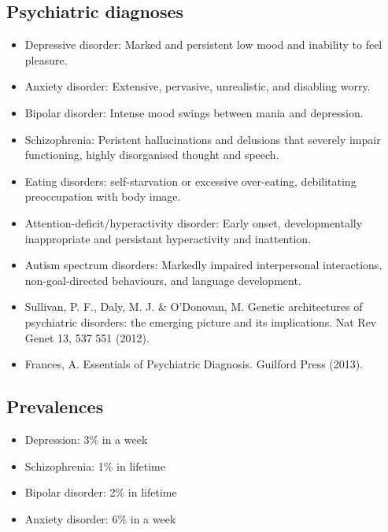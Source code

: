 \documentclass[
  letterpaper,
  DIV=11,
  numbers=noendperiod]{scrartcl}
\providecommand{\tightlist}{%
  \setlength{\itemsep}{0pt}\setlength{\parskip}{0pt}}
\begin{document}
\subsection{Psychiatric diagnoses}\label{psychiatric-diagnoses}

\begin{itemize}
\tightlist
\item
  Depressive disorder: Marked and persistent low mood and inability to
  feel pleasure.
\item
  Anxiety disorder: Extensive, pervasive, unrealistic, and disabling
  worry.
\item
  Bipolar disorder: Intense mood swings between mania and depression.
\item
  Schizophrenia: Peristent hallucinations and delusions that severely
  impair functioning, highly disorganised thought and speech.
\item
  Eating disorders: self-starvation or excessive over-eating,
  debilitating preoccupation with body image.
\item
  Attention-deficit/hyperactivity disorder: Early onset, developmentally
  inappropriate and persistant hyperactivity and inattention.
\item
  Autism spectrum disorders: Markedly impaired interpersonal
  interactions, non-goal-directed behaviours, and language development.
\end{itemize}

\begin{itemize}
\tightlist
\item
  Sullivan, P. F., Daly, M. J. \& O'Donovan, M. Genetic architectures of
  psychiatric disorders: the emerging picture and its implications. Nat
  Rev Genet 13, 537 551 (2012).
\item
  Frances, A. Essentials of Psychiatric Diagnosis. Guilford Press
  (2013).
\end{itemize}

\subsection{Prevalences}\label{prevalences}

\begin{itemize}
\tightlist
\item
  Depression: 3\% in a week
\item
  Schizophrenia: 1\% in lifetime
\item
  Bipolar disorder: 2\% in lifetime
\item
  Anxiety disorder: 6\% in a week
\end{itemize}
\end{document}
